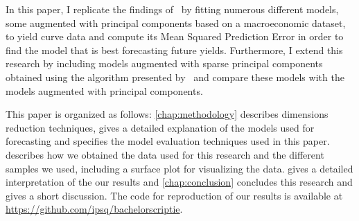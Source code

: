 In this paper, I replicate the findings of~\textcite{swanson_big_2017} by fitting numerous different models, some augmented with principal components based on a macroeconomic dataset, to yield curve data and compute its Mean Squared Prediction Error in order to find the model that is best forecasting future yields. 
Furthermore, I extend this research by including models augmented with sparse principal components obtained using the algorithm presented by~\textcite{zou_sparse_2006} and compare these models with the models augmented with principal components. 

This paper is organized as follows: \cref{chap:methodology} describes dimensions reduction techniques, gives a detailed explanation of the models used for forecasting and specifies the model evaluation techniques used in this paper. 
 describes how we obtained the data used for this research and the different samples we used, including a surface plot for visualizing the data. 
 gives a detailed interpretation of the our results and \cref{chap:conclusion} concludes this research and gives a short discussion. 
The code for reproduction of our results is available at \url{https://github.com/ipsq/bachelorscriptie}. 